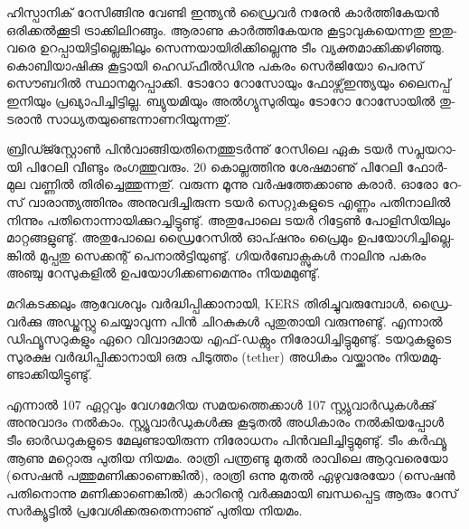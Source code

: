 ­ഹി­സ്പാ­നി­ക് റേ­സി­ങ്ങി­നു വേ­ണ്ടി ഇന്ത്യന്‍ ഡ്രൈ­വര്‍ നരേന്‍ കാര്‍­ത്തി­കേ­യന്‍ ഒരി­ക്കല്‍­ക്കൂ­ടി ട്രാ­ക്കി­ലി­റ­ങ്ങും. ആരാ­ണു 
കാര്‍­ത്തി­കേ­യ­നു കൂ­ട്ടാ­വു­ക­യെ­ന്ന­തു ഇതു­വ­രെ ഉറ­പ്പാ­യി­ട്ടി­ല്ലെ­ങ്കി­ലും സെ­ന്ന­യാ­യി­രി­ക്കി­ല്ലെ­ന്നു ടീം വ്യ­ക്ത­മാ­ക്കി­ക്ക­ഴി­ഞ്ഞു. 
കൊ­ബി­യാ­ഷി­ക്കു കൂ­ട്ടാ­യി ഹെ­ഡ്ഫീല്‍­ഡി­നു പക­രം സെര്‍­ജി­യോ പെ­ര­സ് സൌ­ബ­റില്‍ സ്ഥാ­ന­മു­റ­പ്പാ­ക്കി. ടോ­റോ
 റോ­സോ­യും ഫോ­ഴ്സ്ഇ­ന്ത്യ­യും ലൈ­ന­പ്പ് ഇനി­യും പ്ര­ഖ്യാ­പി­ച്ചി­ട്ടി­ല്ല. ബ്യു­യ­മി­യും അല്‍­ഗ്യു­സു­രി­യും ടോ­റോ റോ­സോ­യില്‍ 
തു­ട­രാന്‍ സാ­ധ്യ­ത­യു­ണ്ടെ­ന്നാ­ണ­റി­യു­ന്ന­തു്.

­ബ്രി­ഡ്ജ്സ്റ്റോണ്‍ പിന്‍­വാ­ങ്ങി­യ­തി­നെ­ത്തു­ടര്‍­ന്നു് റേ­സി­ലെ ഏക ടയര്‍ സപ്ല­യ­റാ­യി പി­റേ­ലി വീ­ണ്ടും രം­ഗ­ത്തു­വ­രും. 20 
കൊ­ല്ല­ത്തി­നു ശേ­ഷ­മാ­ണു് പി­റേ­ലി ഫോര്‍­മുല വണ്ണില്‍ തി­രി­ച്ചെ­ത്തു­ന്ന­തു്. വരു­ന്ന മൂ­ന്നു വര്‍­ഷ­ത്തേ­ക്കാ­ണു കരാര്‍. ഓരോ
റേ­സ് വാ­രാ­ന്ത്യ­ത്തി­നും അനു­വ­ദി­ച്ചി­രു­ന്ന ടയര്‍ സെ­റ്റു­ക­ളു­ടെ എണ്ണം പതി­നാ­ലില്‍ നി­ന്നും പതി­നൊ­ന്നാ­യി­ക്കു­റ­ച്ചി­ട്ടു­ണ്ടു്. 
അതു­പോ­ലെ ടയര്‍ റി­ട്ടേണ്‍ പോ­ളി­സി­യി­ലും മാ­റ്റ­ങ്ങ­ളു­ണ്ടു്. അതു­പോ­ലെ ഡ്രൈ­റേ­സില്‍ ഓപ്ഷ­നും പ്രൈ­മും 
ഉപ­യോ­ഗി­ച്ചി­ല്ലെ­ങ്കില്‍ മു­പ്പ­തു സെ­ക്ക­ന്റ് പെ­നാല്‍­ട്ടി­യു­ണ്ടു്. ഗി­യര്‍­ബോ­ക്സു­കള്‍ നാ­ലി­നു പക­രം അഞ്ചു റേ­സു­ക­ളില്‍ 
ഉപ­യോ­ഗി­ക്ക­ണ­മെ­ന്നും നി­യ­മ­മു­ണ്ടു്.

­മ­റി­ക­ട­ക്ക­ലും ആവേ­ശ­വും വര്‍­ദ്ധി­പ്പി­ക്കാ­നാ­യി, KERS തി­രി­ച്ചു­വ­രു­മ്പോള്‍, ഡ്രൈ­വര്‍­ക്കു അഡ്ജ­സ്റ്റു ചെ­യ്യാ­വു­ന്ന പിന്‍ 
ചി­റ­കു­കള്‍ പു­തു­താ­യി വരു­ന്നു­ണ്ടു്. എന്നാല്‍ ഡി­ഫ്യൂ­സ­റു­ക­ളും ഏറെ വി­വാ­ദ­മായ എഫ്-ഡക്റ്റും നി­രോ­ധി­ച്ചി­ട്ടു­മു­ണ്ടു്. 
ടയ­റു­ക­ളു­ടെ സു­ര­ക്ഷ വര്‍­ദ്ധി­പ്പി­ക്കാ­നാ­യി ഒരു പി­ടു­ത്തം (tether) അധി­കം വയ്ക്കാ­നും നി­യ­മ­മു­ണ്ടാ­ക്കി­യി­ട്ടു­ണ്ടു്.

എ­ന്നാല്‍ 107%
ഏറ്റ­വും വേ­ഗ­മേ­റിയ സമ­യ­ത്തെ­ക്കാള്‍ 107%
സ്റ്റ്യു­വാര്‍­ഡു­കള്‍­ക്കു് അനു­വാ­ദം നല്‍­കാം. സ്റ്റ്യൂ­വാര്‍­ഡു­കള്‍­ക്കു കൂ­ടു­തല്‍ അധി­കാ­രം നല്‍­കി­യ­പ്പോള്‍ ടീം ഓര്‍­ഡ­റു­ക­ളു­ടെ 
മേ­ലു­ണ്ടാ­യി­രു­ന്ന നി­രോ­ധ­നം പിന്‍­വ­ലി­ച്ചി­ട്ടു­മു­ണ്ടു്. ടീം കര്‍­ഫ്യൂ ആണു മറ്റൊ­രു പു­തിയ നി­യ­മം. രാ­ത്രി പന്ത്ര­ണ്ടു മു­തല്‍ 
രാ­വി­ലെ ആറു­വ­രെ­യോ (സെ­ഷന്‍ പത്തു­മ­ണി­ക്കാ­ണെ­ങ്കില്‍), രാ­ത്രി ഒന്നു മു­തല്‍ ഏഴു­വ­രേ­യോ (സെ­ഷന്‍ പതി­നൊ­ന്നു 
മണി­ക്കാ­ണെ­ങ്കില്‍) കാ­റി­ന്റെ വര്‍­ക്കു­മാ­യി ബന്ധ­പ്പെ­ട്ട ആരും റേ­സ് സര്‍­ക്യൂ­ട്ടില്‍ പ്ര­വേ­ശി­ക്ക­രു­തെ­ന്നാ­ണു് പു­തിയ നി­യ­മം­.


